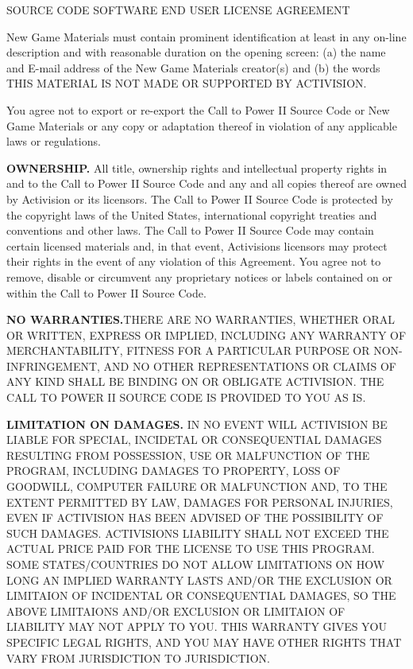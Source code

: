 \begin{section}{SOURCE CODE SOFTWARE END USER LICENSE AGREEMENT}
\begin{flushleft}
{\footnotesize 	New Game Materials must contain prominent identification at least in any on-line description and with reasonable duration on the opening screen: (a) the name and E-mail address of the New Game Materials creator(s) and (b) the words THIS MATERIAL IS NOT MADE OR SUPPORTED BY ACTIVISION. }
\end{flushleft}


\begin{flushleft}
{\footnotesize 	You agree not to export or re-export the Call to Power II Source Code or New Game Materials or any copy or adaptation thereof in violation of any applicable laws or regulations.}
\end{flushleft}


\begin{flushleft}
\textbf{{\footnotesize OWNERSHIP.  }}{\footnotesize All title, ownership rights and intellectual property rights in and to the Call to Power II Source Code and any and all copies thereof are owned by Activision or its licensors. The Call to Power II Source Code is protected by the copyright laws of the United States, international copyright treaties and conventions and other laws.  The Call to Power II Source Code may contain certain licensed materials and, in that event, Activisions licensors may protect their rights in the event of any violation of this Agreement.  You agree not to remove, disable or circumvent any proprietary notices or labels contained on or within the Call to Power II Source Code.}
\end{flushleft}


\begin{flushleft}
\textbf{{\footnotesize NO WARRANTIES.}}{\footnotesize   THERE ARE NO WARRANTIES, WHETHER ORAL OR WRITTEN, EXPRESS OR IMPLIED, INCLUDING ANY WARRANTY OF MERCHANTABILITY, FITNESS FOR A PARTICULAR PURPOSE OR NON-INFRINGEMENT, AND NO OTHER REPRESENTATIONS OR CLAIMS OF ANY KIND SHALL BE BINDING ON OR OBLIGATE ACTIVISION.  THE CALL TO POWER II SOURCE CODE IS PROVIDED TO YOU AS IS. }
\end{flushleft}


\begin{flushleft}
\textbf{{\footnotesize LIMITATION ON DAMAGES.  }}{\footnotesize IN NO EVENT WILL ACTIVISION BE LIABLE FOR SPECIAL, INCIDETAL OR CONSEQUENTIAL DAMAGES RESULTING FROM POSSESSION, USE OR MALFUNCTION OF THE PROGRAM, INCLUDING DAMAGES TO PROPERTY, LOSS OF GOODWILL, COMPUTER FAILURE OR MALFUNCTION AND, TO THE EXTENT PERMITTED BY LAW, DAMAGES FOR PERSONAL INJURIES, EVEN IF ACTIVISION HAS BEEN ADVISED OF THE POSSIBILITY OF SUCH DAMAGES.  ACTIVISIONS LIABILITY SHALL NOT EXCEED THE ACTUAL PRICE PAID FOR THE LICENSE TO USE THIS PROGRAM.  SOME STATES/COUNTRIES DO NOT ALLOW LIMITATIONS ON HOW LONG AN IMPLIED WARRANTY LASTS AND/OR THE EXCLUSION OR LIMITAION OF INCIDENTAL OR CONSEQUENTIAL DAMAGES, SO THE ABOVE LIMITAIONS AND/OR EXCLUSION OR LIMITAION OF LIABILITY MAY NOT APPLY TO YOU.  THIS WARRANTY GIVES YOU SPECIFIC LEGAL RIGHTS, AND YOU MAY HAVE OTHER RIGHTS THAT VARY FROM JURISDICTION TO JURISDICTION.}
\end{flushleft}



\end{section}
